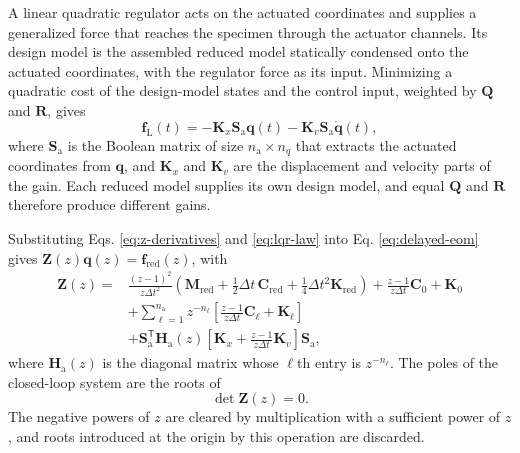 \documentclass[a4paper,fleqn,review,12pt]{cas-sc}
\numberwithin{equation}{section}
\begin{document}
A linear quadratic regulator acts on the actuated coordinates and supplies a generalized force that reaches the specimen through the actuator channels. Its design model is the assembled reduced model statically condensed onto the actuated coordinates, with the regulator force as its input. Minimizing a quadratic cost of the design-model states and the control input, weighted by \(\mathbf{Q}\) and \(\mathbf{R}\), gives
\begin{equation}
  \bm{f}_{\mathrm{L}}(t)
  =-\mathbf{K}_{x}\mathbf{S}_{\mathrm{a}}\bm{q}(t)
  -\mathbf{K}_{v}\mathbf{S}_{\mathrm{a}}\dot{\bm{q}}(t),
  \label{eq:lqr-law}
\end{equation}
where \(\mathbf{S}_{\mathrm{a}}\) is the Boolean matrix of size \(n_{\mathrm{a}}\times n_{q}\) that extracts the actuated coordinates from \(\bm{q}\), and \(\mathbf{K}_{x}\) and \(\mathbf{K}_{v}\) are the displacement and velocity parts of the gain. Each reduced model supplies its own design model, and equal \(\mathbf{Q}\) and \(\mathbf{R}\) therefore produce different gains.

Substituting Eqs. \eqref{eq:z-derivatives} and \eqref{eq:lqr-law} into Eq. \eqref{eq:delayed-eom} gives \(\mathbf{Z}(z)\bm{q}(z)=\bm{f}_{\mathrm{red}}(z)\), with
\begin{equation}
  \begin{aligned}
    \mathbf{Z}(z)={}&
    \frac{(z-1)^{2}}{z\Delta t^{2}}
    \left(
      \mathbf{M}_{\mathrm{red}}
      +\tfrac{1}{2}\Delta t\,\mathbf{C}_{\mathrm{red}}
      +\tfrac{1}{4}\Delta t^{2}\mathbf{K}_{\mathrm{red}}
    \right)
    +\frac{z-1}{z\Delta t}\mathbf{C}_{0}+\mathbf{K}_{0}\\
    &+\sum_{\ell=1}^{n_{\mathrm{a}}}z^{-n_{\ell}}
    \left[
      \frac{z-1}{z\Delta t}\mathbf{C}_{\ell}+\mathbf{K}_{\ell}
    \right]\\
    &+\mathbf{S}_{\mathrm{a}}^{\mathsf{T}}\mathbf{H}_{\mathrm{a}}(z)
    \left[
      \mathbf{K}_{x}+\frac{z-1}{z\Delta t}\mathbf{K}_{v}
    \right]\mathbf{S}_{\mathrm{a}},
  \end{aligned}
  \label{eq:z-matrix}
\end{equation}
where \(\mathbf{H}_{\mathrm{a}}(z)\) is the diagonal matrix whose \(\ell\)th entry is \(z^{-n_{\ell}}\). The poles of the closed-loop system are the roots of
\begin{equation}
  \det\mathbf{Z}(z)=0.
  \label{eq:characteristic-equation}
\end{equation}
The negative powers of \(z\) are cleared by multiplication with a sufficient power of \(z\), and roots introduced at the origin by this operation are discarded.
\end{document}
